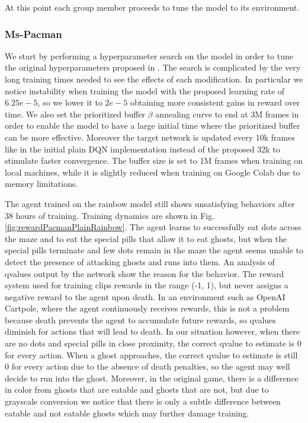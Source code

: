 \documentclass[10pt,twocolumn,letterpaper]{article}
\begin{document}
At this point each group member proceeds to tune the model to its environment.

\subsubsection{Ms-Pacman}
We start by performing a hyperparameter search on the model in order to tune the original hyperparameters proposed in \cite{DBLP:journals/corr/abs-1710-02298}. The search is complicated by the very long training times needed to see the effects of each modification. In particular we notice instability when training the model with the proposed learning rate of $6.25e-5$, so we lower it to $2e-5$ obtaining more consistent gains in reward over time. We also set the prioritized buffer $\beta$ annealing curve to end at 3M frames in order to enable the model to have a large initial time where the prioritized buffer can be more effective. Moreover the target network is updated every 10k frames like in the initial plain DQN implementation instead of the proposed 32k to stimulate faster convergence. The buffer size is set to 1M frames when training on local machines, while it is slightly reduced when training on Google Colab due to memory limitations.

The agent trained on the rainbow model still shows unsatisfying behaviors after 38 hours of training. Training dynamics are shown in Fig. \ref{fig:rewardPacmanPlainRainbow}. The agent learns to successfully eat dots across the maze and to eat the special pills that allow it to eat ghosts, but when the special pills terminate and few dots remain in the maze the agent seems unable to detect the presence of attacking ghosts and runs into them.
An analysis of qvalues output by the network show the reason for the behavior. The reward system used for training clips rewards in the range (-1, 1), but never assigns a negative reward to the agent upon death. In an environment such as OpenAI Cartpole, where the agent continuously receives rewards, this is not a problem because death prevents the agent to accumulate future rewards, so qvalues diminish for actions that will lead to death. In our situation however, when there are no dots and special pills in close proximity, the correct qvalue to estimate is 0 for every action. When a ghost approaches, the correct qvalue to estimate is still 0 for every action due to the absence of death penalties, so the agent may well decide to run into the ghost. Moreover, in the original game, there is a difference in color from ghosts that are eatable and ghosts that are not, but due to grayscale conversion we notice that there is only a subtle difference between eatable and not eatable ghosts which may further damage training.
\end{document}
